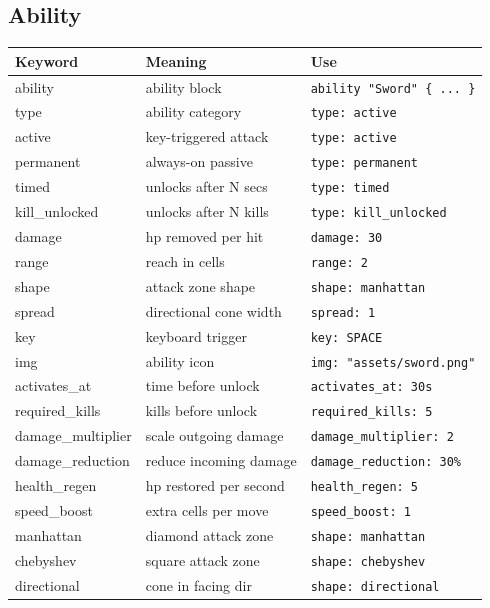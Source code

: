 \documentclass[12pt,a4paper]{article}
\begin{document}
\subsection{Ability}
\begin{longtable}{KMU}
\toprule
\normalfont\textbf{Keyword} & \textbf{Meaning} & \textbf{Use} \\
\midrule
ability            & ability block          & \texttt{ability "Sword" \{ ... \}} \\
type               & ability category       & \texttt{type: active} \\
active             & key-triggered attack   & \texttt{type: active} \\
permanent          & always-on passive      & \texttt{type: permanent} \\
timed              & unlocks after N secs   & \texttt{type: timed} \\
kill\_unlocked     & unlocks after N kills  & \texttt{type: kill\_unlocked} \\
damage             & hp removed per hit     & \texttt{damage: 30} \\
range              & reach in cells         & \texttt{range: 2} \\
shape              & attack zone shape      & \texttt{shape: manhattan} \\
spread             & directional cone width & \texttt{spread: 1} \\
key                & keyboard trigger       & \texttt{key: SPACE} \\
img                & ability icon           & \texttt{img: "assets/sword.png"} \\
activates\_at      & time before unlock     & \texttt{activates\_at: 30s} \\
required\_kills    & kills before unlock    & \texttt{required\_kills: 5} \\
damage\_multiplier & scale outgoing damage  & \texttt{damage\_multiplier: 2} \\
damage\_reduction  & reduce incoming damage & \texttt{damage\_reduction: 30\%} \\
health\_regen      & hp restored per second & \texttt{health\_regen: 5} \\
speed\_boost       & extra cells per move   & \texttt{speed\_boost: 1} \\
manhattan          & diamond attack zone    & \texttt{shape: manhattan} \\
chebyshev          & square attack zone     & \texttt{shape: chebyshev} \\
directional        & cone in facing dir     & \texttt{shape: directional} \\
\bottomrule
\end{longtable}
\end{document}

